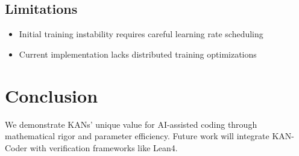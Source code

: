 \documentclass[12pt]{article}
\begin{document}
\subsection{Limitations}
\begin{itemize}
\item Initial training instability requires careful learning rate scheduling
\item Current implementation lacks distributed training optimizations
\end{itemize}

\section{Conclusion}
We demonstrate KANs' unique value for AI-assisted coding through mathematical rigor and parameter efficiency. Future work will integrate KAN-Coder with verification frameworks like Lean4.



\end{document}
